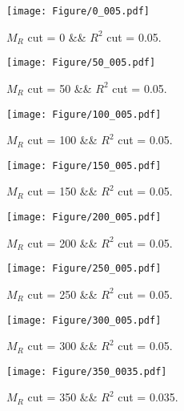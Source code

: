  
\begin{figure}[H] 
\begin{center} 
\texttt{[image: Figure/0\_005.pdf]} 
\caption{$M_R$ cut = 0 \&\& $R^2$ cut = 0.05.} 
\label{Fig:0_0.05} 
\end{center} 
\end{figure} 
 
 
\begin{figure}[H] 
\begin{center} 
\texttt{[image: Figure/50\_005.pdf]} 
\caption{$M_R$ cut = 50 \&\& $R^2$ cut = 0.05.} 
\label{Fig:50_0.05} 
\end{center} 
\end{figure} 
 
 
\begin{figure}[H] 
\begin{center} 
\texttt{[image: Figure/100\_005.pdf]} 
\caption{$M_R$ cut = 100 \&\& $R^2$ cut = 0.05.} 
\label{Fig:100_0.05} 
\end{center} 
\end{figure} 
 
 
\begin{figure}[H] 
\begin{center} 
\texttt{[image: Figure/150\_005.pdf]} 
\caption{$M_R$ cut = 150 \&\& $R^2$ cut = 0.05.} 
\label{Fig:150_0.05} 
\end{center} 
\end{figure} 
 
 
\begin{figure}[H] 
\begin{center} 
\texttt{[image: Figure/200\_005.pdf]} 
\caption{$M_R$ cut = 200 \&\& $R^2$ cut = 0.05.} 
\label{Fig:200_0.05} 
\end{center} 
\end{figure} 
 
 
\begin{figure}[H] 
\begin{center} 
\texttt{[image: Figure/250\_005.pdf]} 
\caption{$M_R$ cut = 250 \&\& $R^2$ cut = 0.05.} 
\label{Fig:250_0.05} 
\end{center} 
\end{figure} 
 
 
\begin{figure}[H] 
\begin{center} 
\texttt{[image: Figure/300\_005.pdf]} 
\caption{$M_R$ cut = 300 \&\& $R^2$ cut = 0.05.} 
\label{Fig:300_0.05} 
\end{center} 
\end{figure} 
 
 
\begin{figure}[H] 
\begin{center} 
\texttt{[image: Figure/350\_0035.pdf]} 
\caption{$M_R$ cut = 350 \&\& $R^2$ cut = 0.035.} 
\label{Fig:350_0.035} 
\end{center} 
\end{figure} 
 
 
